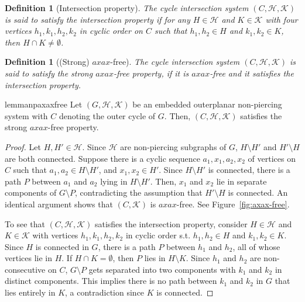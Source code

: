 \documentclass[12pt]{article}
\newcommand{\HH}{\mathcal{H}}
\newcommand{\KK}{\mathcal{K}}
\newtheorem{definition}[theorem]{Definition}
\theoremstyle{case}
\begin{document}
\begin{definition}[Intersection property] The  cycle intersection system $(C,\mathcal{H},\mathcal{K})$ is said to satisfy the \emph{intersection property} if
for any $H\in\mathcal{H}$ and $K\in\mathcal{K}$ with 
four vertices $h_1, k_1, h_2, k_2$ in cyclic order on $C$ such that $h_1, h_2\in H$ and $k_1, k_2\in K$, then $H\cap K\neq\emptyset$.
\end{definition}

\begin{definition}[(Strong) $axax$-free] 
The cycle intersection system $(C,\HH,\KK)$ is said to satisfy the \emph{strong $axax$-free property}, if it is $axax$-free and it satisfies the intersection property.
\end{definition}

\begin{restatable}{lemma}{npaxaxfree}
\label{lem:npaxax-free}
Let $(G,\mathcal{H},\mathcal{K})$ be an embedded outerplanar non-piercing system with $C$ denoting the outer cycle of $G$.
Then, $(C,\mathcal{H},\mathcal{K})$ satisfies the strong $axax$-free property.    
\end{restatable}

\begin{proof}
Let $H,H'\in\mathcal{H}$.
Since $\mathcal{H}$ are non-piercing subgraphs of $G$, $H\setminus H'$ and $H'\setminus H$ are both connected.  
Suppose there is a cyclic sequence $a_1, x_1, a_2, x_2$ of vertices on $C$ such that $a_1, a_2\in H\setminus H'$, and $x_1, x_2\in H'$.
Since $H\setminus H'$ is connected, there is a path $P$ between $a_1$ and $a_2$ lying in $H\setminus H'$. Then, $x_1$ and $x_2$ lie in separate components of $G\setminus P$, contradicting the assumption that $H'\setminus H$ is connected.
An identical argument shows that $(C,\mathcal{K})$ is $axax$-free.
See Figure~\ref{fig:axax-free}. 

To see that $(C,\mathcal{H},\mathcal{K})$ satisfies the intersection property, consider $H\in\mathcal{H}$ and
$K\in\mathcal{K}$ with vertices $h_1, k_1, h_2, k_2$ in cyclic order s.t. $h_1, h_2\in H$ and $k_1, k_2\in K$.
Since $H$ is connected in $G$, there is a path $P$ 
between $h_1$ and $h_2$, all of whose vertices lie in $H$. 
If $H\cap K=\emptyset$, then $P$ lies in $H\setminus K$. Since
$h_1$ and $h_2$ are non-consecutive on $C$, $G\setminus P$ gets
separated into two components with $k_1$ and $k_2$ in distinct
components. This implies there is no path between $k_1$ and
$k_2$ in $G$ that lies entirely in $K$, a contradiction since $K$ is connected.
\end{proof}
\end{document}
